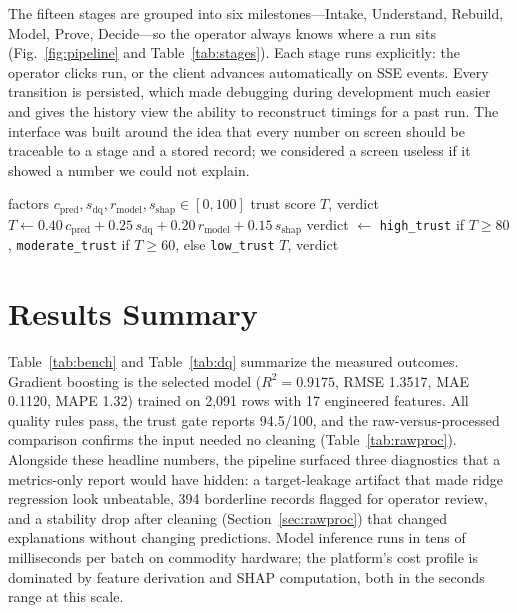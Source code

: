 \documentclass[conference]{IEEEtran}
\begin{document}
The fifteen stages are grouped into six milestones---Intake, Understand, Rebuild, Model, Prove, Decide---so the operator always knows where a run sits (Fig.~\ref{fig:pipeline} and Table~\ref{tab:stages}). Each stage runs explicitly: the operator clicks run, or the client advances automatically on SSE events. Every transition is persisted, which made debugging during development much easier and gives the history view the ability to reconstruct timings for a past run. The interface was built around the idea that every number on screen should be traceable to a stage and a stored record; we considered a screen useless if it showed a number we could not explain.

\begin{algorithm}[!t]
\caption{TrustGate}
\label{alg:gate}
\begin{algorithmic}[1]
\REQUIRE factors $c_{\text{pred}}, s_{\text{dq}}, r_{\text{model}}, s_{\text{shap}} \in [0,100]$
\ENSURE trust score $T$, verdict
\STATE $T \gets 0.40\,c_{\text{pred}} + 0.25\,s_{\text{dq}} + 0.20\,r_{\text{model}} + 0.15\,s_{\text{shap}}$
\STATE verdict $\gets$ \texttt{high\_trust} if $T \ge 80$, \texttt{moderate\_trust} if $T \ge 60$, else \texttt{low\_trust}
\RETURN $T$, verdict
\end{algorithmic}
\end{algorithm}

\section{Results Summary}

Table~\ref{tab:bench} and Table~\ref{tab:dq} summarize the measured outcomes. Gradient boosting is the selected model ($R^2=0.9175$, RMSE 1.3517, MAE 0.1120, MAPE 1.32) trained on 2,091 rows with 17 engineered features. All quality rules pass, the trust gate reports 94.5/100, and the raw-versus-processed comparison confirms the input needed no cleaning (Table~\ref{tab:rawproc}). Alongside these headline numbers, the pipeline surfaced three diagnostics that a metrics-only report would have hidden: a target-leakage artifact that made ridge regression look unbeatable, 394 borderline records flagged for operator review, and a stability drop after cleaning (Section~\ref{sec:rawproc}) that changed explanations without changing predictions. Model inference runs in tens of milliseconds per batch on commodity hardware; the platform's cost profile is dominated by feature derivation and SHAP computation, both in the seconds range at this scale.
\end{document}

